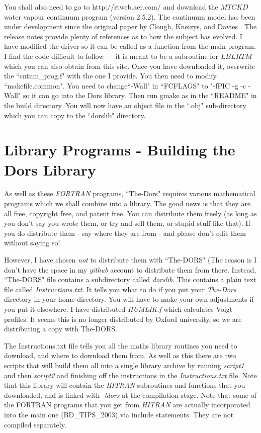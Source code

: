 \documentclass[12pt]{article}
\begin{document}
You shall also need to go to http://rtweb.aer.com/ and download the $MT CKD$ water vapour continuum program (version 2.5.2). The continuum model has been under development since the original paper by Clough, Kneizys, and Davies \cite{MTCKD:Mybib}. The release notes provide plenty of references as to how the subject has evolved. I have modified the driver so it can be called
as a function from the main program. I find the code difficult to follow --- it is meant to be a subroutine for $LBLRTM$
which you can also obtain from this site. Once you have downloaded it, overwrite the ``cntnm\_prog.f"  with the one I provide.
You then need to modify ``makefile.common". You need to change``-Wall" in ``FCFLAGS"  to "-fPIC -g -c -Wall" so it can go into the Dors library. Then run gmake as in the ``README" in the build directory. You will now have an object file in the ``.obj"
 sub-directory which you can copy to the ``dorslib" directory.


\section{Library Programs - Building the Dors Library}

As well as these {\it FORTRAN} programs, ``The-Dors" requires various mathematical programs which we shall
 combine into a library. The good news is
that they are all free, copyright free, and patent free. You can distribute them freely (as long as you don't say you wrote
 them, or try and sell them,  or stupid stuff like that). If you do distribute them - say where they are from - and please don't edit them without saying so!  

However, I have chosen {\it not} to distribute
them with ``The-DORS" (The reason is I don't have the space in my {\it github} account to distribute
them from there.  Instead, ``The-DORS" file contains a subdirectory called  {\it dorslib}.
This contains a plain text file called {\it Instructions.txt}. It tells you what to do if you put your {\it The-Dors}
directory in your home directory. You will have to make your own adjustments if you put it elsewhere.
I have distributed {\it HUMLIK.f} \cite{BobWells:MyBib} which calculates Voigt profiles. It seems this is no longer
distributed by Oxford university, so we are distributing a copy with The-DORS.

The Instructions.txt file tells you all the maths library routines you need to download, and where to download them from. 
As well as this
there are two scripts that will build them all into a single library archive by running {\it script1} and then {\it script2}
and finishing off the instructions in the {\it Instructions.txt} file.
Note that this library will contain the {\it HITRAN} subroutines and functions that you downloaded, and is linked
 with {\it -ldors} at the compilation stage. Note that some of the FORTRAN programs that you get from {\it HITRAN}
are actually incorporated into the main one (BD\_TIPS\_2003) via include statements. They are not compiled separately.
\end{document}
